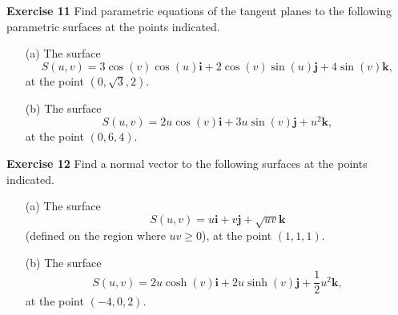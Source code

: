 \documentclass[12pt,oneside]{exam}
\newenvironment{exercise}[1]{\vspace{.1in}\noindent\textbf{Exercise #1 \hspace{.05em}}}{}
\begin{document}
\begin{exercise}{11}
Find parametric equations of the tangent planes to the following parametric surfaces at the points indicated. 
\begin{itemize}
\item[(a)] The surface 
\begin{equation*}
S(u,v)=3\cos(v)\cos(u) \textbf{i}+ 2\cos(v)\sin(u) \textbf{j} + 4 \sin(v)\textbf{k}, 
\end{equation*}
at the point $(0,\sqrt{3},2)$. 
\item[(b)] The surface 
\begin{equation*}
S(u,v)= 2u\cos(v)\textbf{i} + 3u\sin(v) \textbf{j} + u^2\textbf{k}, 
\end{equation*}
at the point $(0,6,4)$. 
\end{itemize}
\end{exercise}

\begin{exercise}{12}
Find a normal vector to the following surfaces at the points indicated. 
\begin{itemize}
\item[(a)] The surface
\begin{equation*}
S(u,v)=u\textbf{i} + v\textbf{j} + \sqrt{uv} \textbf{k}
\end{equation*}
(defined on the region where $uv \geq 0$), at the point $(1,1,1)$.  
\item[(b)] The surface 
\begin{equation*}
S(u,v)=2u\cosh(v) \textbf{i} + 2u \sinh(v)\textbf{j} + \frac{1}{2}u^2 \textbf{k},
\end{equation*}
 at the point $(-4,0,2)$. 
\end{itemize}
\end{exercise}
\end{document}
